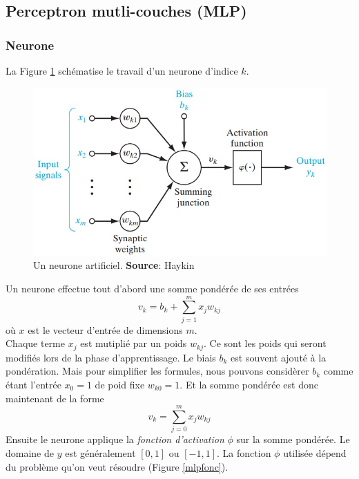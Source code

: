 \subsection{Perceptron mutli-couches (MLP)}
\subsubsection{Neurone}
La Figure \ref{neuronemlp} schématise le travail d'un neurone d'indice $k$.
\begin{figure}
 \centering
 \includegraphics[scale=0.5]{../figures/neurone.jpg}
 \caption{Un neurone artificiel. \textbf{Source}: Haykin\cite{Haykin}}
 \label{neuronemlp}
\end{figure}
Un neurone effectue tout d'abord une somme pondérée de ses entrées \[v_k = b_k+\sum_{j=1}^{m}x_{j}w_{kj}\] où $x$ est le vecteur d'entrée de dimensions $m$.\\
Chaque terme $x_j$ est mutiplié par un poids $w_{kj}$.
Ce sont les poids qui seront modifiés lors de la phase d'apprentissage.
Le biais $b_k$ est souvent ajouté à la pondération.
Mais pour simplifier les formules, nous pouvons considèrer $b_k$ comme étant l'entrée $x_0 = 1$ de poid fixe $w_{k0} = 1$.
Et la somme pondérée est donc maintenant de la forme \[v_k = \sum_{j=0}^{m}x_{j}w_{kj}\]
Ensuite le neurone applique la \emph{fonction d'activation} $\phi$ sur la somme pondérée.
Le domaine de $y$ est généralement $[0,1]$ ou $[-1,1]$.\cite{Haykin,statistica}
La fonction $\phi$ utilisée dépend du problème qu'on veut résoudre (Figure \ref{mlpfonc}).
